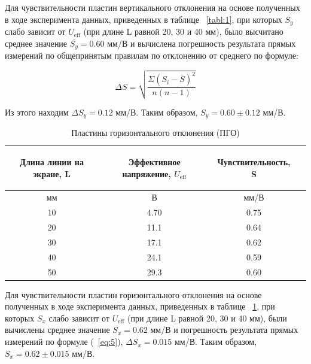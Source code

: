 Для чувствительности пластин вертикального отклонения на основе полученных в ходе эксперимента данных, приведенных в таблице ~\ref{tabl:1}, при которых $S_y$ слабо зависит от $U_{\text{eff}}$ (при длине L равной 20, 30 и 40 мм), было высчитано среднее значение $\overline{S_y} = 0.60$ мм/В и вычислена погрешность результата прямых измерений по общепринятым правилам по отклонению от среднего по формуле:

\begin{equation}
\label{eq:5}
   \Delta S=\sqrt{\frac{\Sigma{(S_i-\overline{S})^2}}{n(n-1)}}
\end{equation}

Из этого находим $\Delta S_y = 0.12$ мм/В. Таким образом, $S_y = 0.60 \pm 0.12$ мм/В.

\begin{center}
\begin{table}[H]
\centering
\caption{Пластины горизонтального отклонения (ПГО)}
\label{tabl:2}
\renewcommand{\arraystretch}{1.15}
\begin{tabular}{|c|c|c|c|}
\hline
\begin{minipage}{5cm}
\begin{center}
    Длина линии на экране, L
\end{center}
\end{minipage} &
\begin{minipage}{5cm}
\begin{center}
    Эффективное напряжение, $U_{\text{eff}}$
\end{center}
\end{minipage} &
\begin{minipage}{5cm}
\begin{center}
    Чувствительность, S
\end{center}
\end{minipage}\\
\hline
мм&В&мм/В\\
\hline
10  &  4.70  &  0.75 \\
20  &  11.1  &  0.64 \\
30  &  17.1  &  0.62 \\
40  &  24.1  &  0.59 \\
50  &  29.3  &  0.60 \\
\hline
\end{tabular}
\end{table}
\end{center}

Для чувствительности пластин горизонтального отклонения на основе полученных в ходе эксперимента данных, приведенных в таблице ~\ref{tabl:2}, при которых $S_x$ слабо зависит от $U_{\text{eff}}$ (при длине L равной 20, 30 и 40 мм), были вычислены среднее значение $\overline{S_x} = 0.62$ мм/В и погрешность результата прямых измерений по формуле (~\ref{eq:5}), $\Delta S_x = 0.015$ мм/В. Таким образом, $S_x = 0.62 \pm 0.015$ мм/В.

